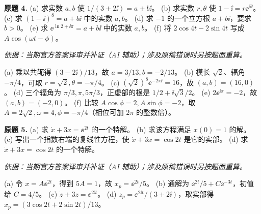 \begin{exercise}\label{cw:ex1-4}\textbf{原题 4.}
(a) 求实数 $a,b$ 使 $1/(3+2\ii)=a+b\ii$。
(b) 求实数 $r,\theta$ 使 $1-\ii=r\ee^{\ii\theta}$。
(c) 求 $(1-\ii)^8=a+b\ii$ 中的实数 $a,b$。
(d) 求 $-1$ 的一个立方根 $a+b\ii$，要求 $b>0$。
(e) 求 $\ee^{\ln2+\ii\pi}=a+b\ii$ 中的实数 $a,b$。
(f) 将 $2\cos4t-2\sin4t$ 写成 $A\cos(\omega t-\phi)$。
\end{exercise}
\begin{solution}
\textit{依据：当期官方答案译审并补证（AI 辅助）；涉及原稿错误时另按题面重算。}\par
(a) 乘以共轭得 $(3-2\ii)/13$，故 $a=3/13,b=-2/13$。
(b) 模长 $\sqrt2$、辐角 $-\pi/4$，可取 $r=\sqrt2,\theta=-\pi/4$。
(c) $(\sqrt2)^8\ee^{-2\pi\ii}=16$，故 $(a,b)=(16,0)$。
(d) 三个辐角为 $\pi/3,\pi,5\pi/3$，正虚部的根是 $1/2+\ii\sqrt3/2$。
(e) $2\ee^{\ii\pi}=-2$，故 $(a,b)=(-2,0)$。
(f) 比较 $A\cos\phi=2,A\sin\phi=-2$，取 $A=2\sqrt2,\omega=4,\phi=-\pi/4$（相位可加 $2\pi$ 的整数倍）。
\end{solution}
\begin{exercise}\label{cw:ex1-5}\textbf{原题 5.}
(a) 求 $\dot x+3x=\ee^{2t}$ 的一个特解。
(b) 求该方程满足 $x(0)=1$ 的解。
(c) 写出一个指数右端的复线性方程，使 $\dot x+3x=\cos2t$ 是它的实部。
(d) 求 $\dot x+3x=\cos2t$ 的一个特解。
\end{exercise}
\begin{solution}
\textit{依据：当期官方答案译审并补证（AI 辅助）；涉及原稿错误时另按题面重算。}\par
(a) 令 $x=A\ee^{2t}$，得到 $5A=1$，故 $x_p=\ee^{2t}/5$。
(b) 通解为 $\ee^{2t}/5+C\ee^{-3t}$，初值给 $C=4/5$。
(c) $\dot z+3z=\ee^{2\ii t}$。
(d) $z_p=\ee^{2\ii t}/(3+2\ii)$，取实部得 $x_p=(3\cos2t+2\sin2t)/13$。
\end{solution}

